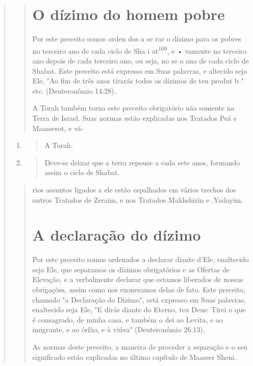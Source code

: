 \begin{quote}
\begin{quote}
\section{O dízimo do homem pobre}

Por este preceito somos orden dos a se rar o dízimo para os po­bres no
terceiro ano de cada ciclo de Sha i at\textsuperscript{169}, e • vamente
no terceiro ano depois de cada terceiro ano, ou seja, no se o ano de
cada ciclo de Shabat. Este preceito está expresso em Suas palavras, e
altecido seja Ele, "Ao fim de três anos tirarás todos os dízimos de teu
produt b " etc. (Deuteronômio 14:28).

A Torah também torna este preceito obrigatório não somente na Terra de
Israel. Suas normas estão explicadas nos Tratados Peá e Maasserot, e vá-
\end{quote}

\begin{enumerate}
\def\labelenumi{\arabic{enumi}.}
\setcounter{enumi}{167}
\item
 \begin{quote}
 A Torah.
 \end{quote}
\item
 \begin{quote}
 Deve-se deixar que a terra repouse a cada sete anos, formando assim o
 ciclo de Shabat.
 \end{quote}
\end{enumerate}

\begin{quote}


rios assuntos ligados a ele estão espalhados em vários trechos dos
outros Trata­dos de Zeraim, e nos Tratados Makhshirin e .Yadayim.

\section{A declaração do dízimo}

Por este preceito somos ordenados a declarar diante d'Ele, enalteci­do
seja Ele, que separamos os dízimos obrigatórios e as Ofertas de
Elevação, e a verbalmente declarar que estamos liberados de nossas
obrigações, assim co­mo nos exoneramos delas de fato. Este preceito,
chamado "a Declaração do Dízimo", está expresso em Suas palavras,
enaltecido seja Ele, "E dirás diante do Eterno, teu Deus: Tirei o que é
consagrado, de minha casa, e também o dei ao Levita, e ao imigrante, e
ao órfão, e à viúva" (Deuteronômio 26:13).

As normas deste preceito, a maneira de proceder a separação e o seu
significado estão explicadas no último capítulo de Maasser Sheni.


\end{quote}
\end{quote}
